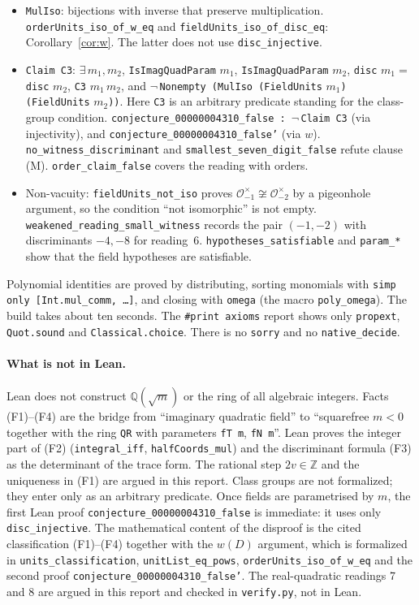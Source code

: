 \documentclass[11pt]{article}
\theoremstyle{definition}
\theoremstyle{remark}
\newcommand{\Q}{\mathbb{Q}}
\newcommand{\Z}{\mathbb{Z}}
\newcommand{\OO}{\mathcal{O}}
\begin{document}
\begin{itemize}
and \texttt{field\_units\_card}: the field case.
\item \texttt{MulIso}: bijections with inverse that preserve multiplication.
\texttt{orderUnits\_iso\_of\_w\_eq} and \texttt{fieldUnits\_iso\_of\_disc\_eq}:
Corollary~\ref{cor:w}. The latter does not use \texttt{disc\_injective}.
\item \texttt{Claim C3}: $\exists\,m_1,m_2$, \texttt{IsImagQuadParam} $m_1$,
\texttt{IsImagQuadParam} $m_2$, \texttt{disc} $m_1=$ \texttt{disc} $m_2$, \texttt{C3} $m_1\,m_2$,
and $\neg$\,\texttt{Nonempty (MulIso (FieldUnits} $m_1$\texttt{) (FieldUnits} $m_2$\texttt{))}.
Here \texttt{C3} is an arbitrary predicate standing for the class-group condition.
\texttt{conjecture\_00000004310\_false : }$\neg$\,\texttt{Claim C3} (via injectivity), and
\texttt{conjecture\_00000004310\_false'} (via $w$). \texttt{no\_witness\_discriminant} and
\texttt{smallest\_seven\_digit\_false} refute clause (M). \texttt{order\_claim\_false} covers
the reading with orders.
\item Non-vacuity: \texttt{fieldUnits\_not\_iso} proves
$\OO_{-1}^\times\not\cong\OO_{-2}^\times$ by a pigeonhole argument, so the condition ``not
isomorphic'' is not empty. \texttt{weakened\_reading\_small\_witness} records the pair
$(-1,-2)$ with discriminants $-4,-8$ for reading~6. \texttt{hypotheses\_satisfiable} and
\texttt{param\_*} show that the field hypotheses are satisfiable.
\end{itemize}
Polynomial identities are proved by distributing, sorting monomials with
\texttt{simp only [Int.mul\_comm, \dots]}, and closing with \texttt{omega} (the macro
\texttt{poly\_omega}). The build takes about ten seconds. The \texttt{\#print axioms} report
shows only \texttt{propext}, \texttt{Quot.sound} and \texttt{Classical.choice}. There is no
\texttt{sorry} and no \texttt{native\_decide}.

\paragraph{What is not in Lean.} Lean does not construct $\Q(\sqrt m)$ or the ring of all
algebraic integers. Facts (F1)--(F4) are the bridge from ``imaginary quadratic field'' to
``squarefree $m<0$ together with the ring \texttt{QR} with parameters \texttt{fT m},
\texttt{fN m}''. Lean proves the integer part of (F2) (\texttt{integral\_iff},
\texttt{halfCoords\_mul}) and the discriminant formula (F3) as the determinant of the trace
form. The rational step $2v\in\Z$ and the uniqueness in (F1) are argued in this report. Class
groups are not formalized; they enter only as an arbitrary predicate. Once fields are parametrised by $m$, the first Lean proof
\texttt{conjecture\_00000004310\_false} is immediate: it uses only \texttt{disc\_injective}.
The mathematical content of the disproof is the cited classification (F1)--(F4) together with
the $w(D)$ argument, which is formalized in \texttt{units\_classification},
\texttt{unitList\_eq\_pows}, \texttt{orderUnits\_iso\_of\_w\_eq} and the second proof
\texttt{conjecture\_00000004310\_false'}. The real-quadratic readings 7 and 8 are argued in
this report and checked in \texttt{verify.py}, not in Lean.
\end{document}
